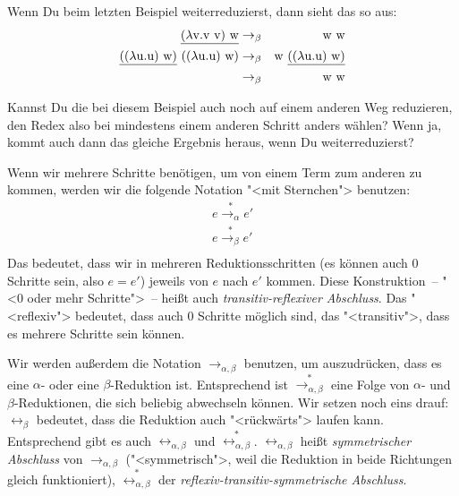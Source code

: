 Wenn Du beim letzten Beispiel weiterreduzierst, dann sieht das so aus:
%
\begin{eqnarray*}
  \underline{(\lambda \mathrm v .\mathrm v~\mathrm v)~\mathrm w} & \rightarrow_{\beta} & \mathrm w~\mathrm w\\
  \underline{((\lambda \mathrm u.\mathrm u)~\mathrm w)}~((\lambda \mathrm u.\mathrm u)~\mathrm w)
  & \rightarrow_{\beta} & 
  \mathrm w~\underline{((\lambda \mathrm u.\mathrm u)~\mathrm w)} \\
  & \rightarrow_{\beta} & \mathrm w~\mathrm w
\end{eqnarray*}
%
\begin{aufgabeinline}
  Kannst Du die bei diesem Beispiel auch noch auf einem anderen Weg
  reduzieren, den Redex also bei mindestens einem anderen Schritt
  anders wählen?  Wenn ja, kommt auch dann das gleiche Ergebnis
  heraus, wenn Du weiterreduzierst?
\end{aufgabeinline}
%
Wenn wir mehrere Schritte benötigen, um von einem Term zum anderen zu
kommen, werden wir die folgende Notation "<mit Sternchen"> benutzen:
%
\begin{eqnarray*}
  e \overset{\ast}{\rightarrow_\alpha} e'\\
  e \overset{\ast}{\rightarrow_\beta} e'\\
\end{eqnarray*}
%
Das bedeutet, dass wir in mehreren Reduktionsschritten (es können auch
0 Schritte sein, also $e = e'$) jeweils von $e$ nach $e'$ kommen.
Diese Konstruktion~-- "<0 oder mehr Schritte">~-- heißt auch
\textit{transitiv-reflexiver Abschluss}.  Das "<reflexiv">
bedeutet, dass auch 0 Schritte möglich sind, das "<transitiv">, dass
es mehrere Schritte sein können.

Wir werden außerdem die Notation $\rightarrow_{\alpha,\beta}$
benutzen, um auszudrücken, dass es eine $\alpha$- oder eine
$\beta$-Reduktion ist.  Entsprechend ist
$\overset{\ast}{\rightarrow_{\alpha,\beta}}$ eine Folge von $\alpha$-
und $\beta$-Reduktionen, die sich beliebig abwechseln können.  Wir
setzen noch eins drauf: $\leftrightarrow_\beta$ bedeutet, dass die
Reduktion auch "<rückwärts"> laufen kann.  Entsprechend gibt es auch
$\leftrightarrow_{\alpha, \beta}$ und
$\overset{\ast}{\leftrightarrow_{\alpha,\beta}}$.
$\leftrightarrow_{\alpha, \beta}$ heißt \textit{symmetrischer
  Abschluss} von $\rightarrow_{\alpha,
  \beta}$ ("<symmetrisch">, weil die Reduktion in beide Richtungen
gleich funktioniert), $\overset{\ast}{\leftrightarrow_{\alpha,\beta}}$
der \textit{reflexiv-transitiv-symmetrische Abschluss}.

